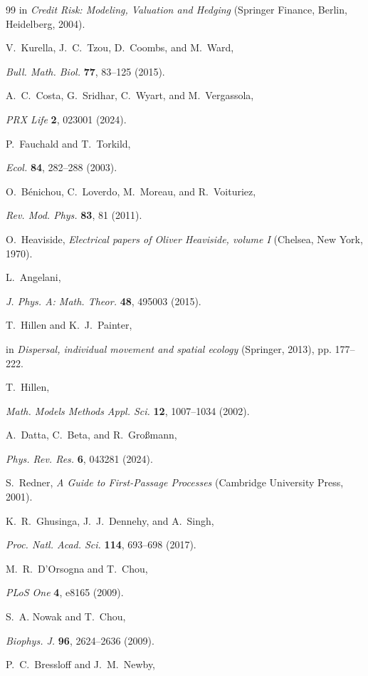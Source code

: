 \documentclass[
 reprint,










 amsmath,amssymb,
 aps, prl,






longbibliography
]{revtex4-2}
\begin{document}
\begin{thebibliography}{99}
in \emph{Credit Risk: Modeling, Valuation and Hedging} (Springer Finance, Berlin, Heidelberg, 2004).

V.~Kurella, J.~C.~Tzou, D.~Coombs, and M.~Ward,

\emph{Bull. Math. Biol.} \textbf{77}, 83--125 (2015).

A.~C.~Costa, G.~Sridhar, C.~Wyart, and M.~Vergassola,

 \emph{PRX Life} \textbf{2}, 023001 (2024).

P.~Fauchald and T.~Torkild,

\emph{Ecol.} \textbf{84}, 282--288 (2003).

O.~Bénichou, C.~Loverdo, M.~Moreau, and R.~Voituriez,

\emph{Rev. Mod. Phys.} \textbf{83}, 81 (2011).

O.~Heaviside, \emph{Electrical papers of Oliver Heaviside, volume I} (Chelsea, New York, 1970).

L.~Angelani,

\emph{J. Phys. A: Math. Theor.} \textbf{48}, 495003 (2015).

T.~Hillen and K.~J.~Painter,

in \emph{Dispersal, individual movement and spatial ecology} (Springer, 2013), pp. 177--222.

T.~Hillen,

 \emph{Math. Models Methods Appl. Sci.} \textbf{12}, 1007--1034 (2002).

A.~Datta, C.~Beta, and R.~Großmann,

\emph{Phys. Rev. Res.} \textbf{6}, 043281 (2024).

S.~Redner, \emph{A Guide to First-Passage Processes} (Cambridge University Press, 2001).

K.~R.~Ghusinga, J.~J.~Dennehy, and A.~Singh,

\emph{Proc. Natl. Acad. Sci.} \textbf{114}, 693--698 (2017).

M.~R.~D'Orsogna and T.~Chou,

 \emph{PLoS One} \textbf{4}, e8165 (2009).

S.~A. Nowak and T.~Chou,

\emph{Biophys. J.} \textbf{96}, 2624--2636 (2009).

P.~C.~Bressloff and J.~M.~Newby,


\end{thebibliography}
\end{document}
